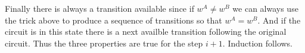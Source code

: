 \documentclass{article}
\begin{document}
Finally there is always a transition available since if $w^A\neq w^B$ we can always use the trick above to produce a sequence of transitions so that $w^A= w^B$.  And if the circuit is in this state there is a next availble transition following the original circuit.  Thus the three properties are true for the step $i+1$.  Induction follows.
\end{document}
